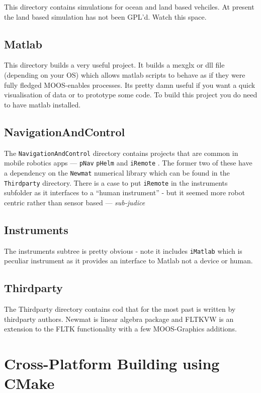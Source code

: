 \documentclass[a4paper,10pt]{article}
\newcommand{\Code}[1]{\texttt{#1} }
\newcommand{\code}[1]{\Code{#1} }
\begin{document}
This directory contains simulations for ocean and land based vehciles. At present the land based simulation has not been GPL'd. Watch this space.

\subsection{Matlab}

This directory builds a very useful project. It builds a mexglx or dll file (depending on your OS) which allows matlab scripts to behave as if they were fully fledged MOOS-enables processes. Its pretty damn useful if you want a quick visualisation of data or to prototype some code. To build this project you do need to have matlab installed.


\subsection{NavigationAndControl}
The \code{NavigationAndControl} directory contains projects that are common
in mobile robotics apps --- \code{pNav} \code{pHelm} and
\code{iRemote}. The former two of these have a dependency on the \code{Newmat} numerical library which can be found in the \code{Thirdparty} directory. There is a case to
put \code{iRemote} in the instruments subfolder as it interfaces to a
``human instrument'' - but it seemed more robot centric rather
than sensor based --- {\it{sub-judice}}

\subsection{Instruments}

The instruments subtree is pretty obvious - note it  includes
\code{iMatlab} which is peculiar instrument as it provides an
interface to Matlab not a device or human.

\subsection{Thirdparty}

The Thirdparty directory contains cod that for the most past is
written by thirdparty authors. Newmat is linear algebra package
and FLTKVW is an extension to the FLTK functionality with a few
MOOS-Graphics additions.


\section{Cross-Platform Building using CMake}\label{Sec:UsingCMake}
\end{document}
